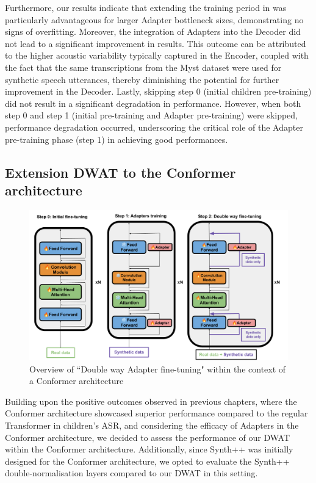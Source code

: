 Furthermore, our results indicate that extending the training period in was particularly advantageous for larger Adapter bottleneck sizes, demonstrating no signs of overfitting. Moreover, the integration of Adapters into the Decoder did not lead to a significant improvement in results. This outcome can be attributed to the higher acoustic variability typically captured in the Encoder, coupled with the fact that the same transcriptions from the Myst dataset were used for synthetic speech utterances, thereby diminishing the potential for further improvement in the Decoder. Lastly, skipping step 0 (initial children pre-training) did not result in a significant degradation in performance. However, when both step 0 and step 1 (initial pre-training and Adapter pre-training) were skipped, performance degradation occurred, underscoring the critical role of the Adapter pre-training phase (step 1) in achieving good performances.

\subsection{Extension DWAT to the Conformer architecture}
\begin{figure}
    \centering
    \includegraphics[width=\textwidth]{imgs/Overall_system.png}
    \caption{Overview of ``Double way Adapter fine-tuning"  within the context of a Conformer architecture}
    \label{fig:TTS_conformer}
\end{figure}

Building upon the positive outcomes observed in previous chapters, where the Conformer architecture showcased superior performance compared to the regular Transformer in children's \ac{ASR}, and considering the efficacy of Adapters in the Conformer architecture, we decided to assess the performance of our \ac{DWAT} within the Conformer architecture. Additionally, since Synth++ \cite{hu2022synt++} was initially designed for the Conformer architecture, we opted to evaluate the Synth++ double-normalisation layers compared to our \ac{DWAT} in this setting. 

